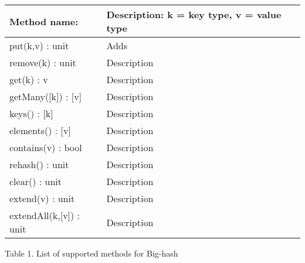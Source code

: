 \newpage
\begin{center}
    \begin{tabular}{ | p{4cm} | p{8cm} |}
    \hline
    \textbf{Method name:} & \textbf{ Description:} k = key type, v = value type  \\ \hline
    put(k,v) : unit & Adds \\ \hline
    remove(k) : unit & Description \\ \hline
    get(k) : v & Description \\ \hline
    getMany([k]) : [v] & Description \\ \hline
    keys() : [k] & Description \\ \hline
    elements() : [v] & Description \\ \hline
    contains(v) : bool & Description \\ \hline
    rehash() : unit & Description \\ \hline
    clear() : unit & Description \\ \hline
    extend(v) : unit & Description \\ \hline
    extendAll(k,[v]) : unit & Description \\ \hline
    \end{tabular}
\end{center}
\begin{center} Table 1. List of supported methods for Big-hash \end{center}
